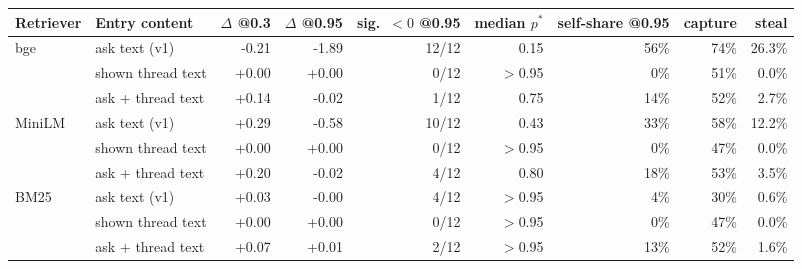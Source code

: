 \begin{tabular}{llrrrrrrr}\toprule Retriever & Entry content & $\Delta$ @0.3 & $\Delta$ @0.95 & sig.\ $<0$ @0.95 & median $p^*$ & self-share @0.95 & capture & steal\\\midrule
bge & ask text (v1) & -0.21 & -1.89 & 12/12 & 0.15 & 56\% & 74\% & 26.3\%\\
 & shown thread text & +0.00 & +0.00 & 0/12 & $>$0.95 & 0\% & 51\% & 0.0\%\\
 & ask + thread text & +0.14 & -0.02 & 1/12 & 0.75 & 14\% & 52\% & 2.7\%\\
\addlinespace[2pt]
MiniLM & ask text (v1) & +0.29 & -0.58 & 10/12 & 0.43 & 33\% & 58\% & 12.2\%\\
 & shown thread text & +0.00 & +0.00 & 0/12 & $>$0.95 & 0\% & 47\% & 0.0\%\\
 & ask + thread text & +0.20 & -0.02 & 4/12 & 0.80 & 18\% & 53\% & 3.5\%\\
\addlinespace[2pt]
BM25 & ask text (v1) & +0.03 & -0.00 & 4/12 & $>$0.95 & 4\% & 30\% & 0.6\%\\
 & shown thread text & +0.00 & +0.00 & 0/12 & $>$0.95 & 0\% & 47\% & 0.0\%\\
 & ask + thread text & +0.07 & +0.01 & 2/12 & $>$0.95 & 13\% & 52\% & 1.6\%\\
\bottomrule\end{tabular}